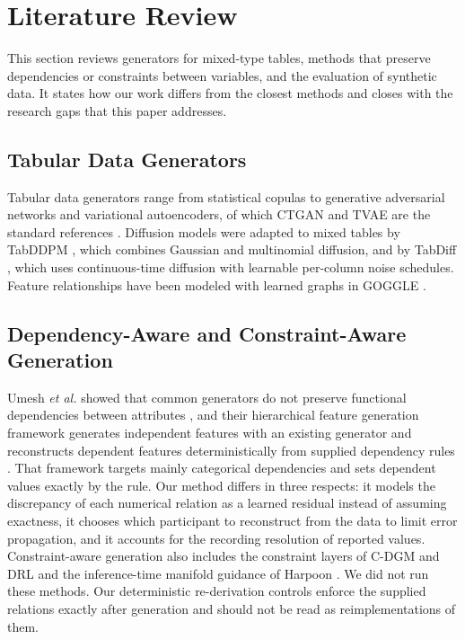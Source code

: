 \documentclass[conference]{IEEEtran}
\begin{document}
\section{Literature Review}
\label{sec:literature}

This section reviews generators for mixed-type tables, methods that preserve dependencies or constraints between variables, and the evaluation of synthetic data. It states how our work differs from the closest methods and closes with the research gaps that this paper addresses.

\subsection{Tabular Data Generators}

Tabular data generators range from statistical copulas to generative adversarial networks and variational autoencoders, of which CTGAN and TVAE are the standard references \cite{xu2019ctgan}. Diffusion models \cite{ho2020ddpm,austin2021d3pm} were adapted to mixed tables by TabDDPM \cite{kotelnikov2023tabddpm}, which combines Gaussian and multinomial diffusion, and by TabDiff \cite{shi2025tabdiff}, which uses continuous-time diffusion with learnable per-column noise schedules. Feature relationships have been modeled with learned graphs in GOGGLE \cite{liu2023goggle}.

\subsection{Dependency-Aware and Constraint-Aware Generation}

Umesh \textit{et al.} showed that common generators do not preserve functional dependencies between attributes \cite{umesh2024dependencies}, and their hierarchical feature generation framework generates independent features with an existing generator and reconstructs dependent features deterministically from supplied dependency rules \cite{umesh2025hfgf}. That framework targets mainly categorical dependencies and sets dependent values exactly by the rule. Our method differs in three respects: it models the discrepancy of each numerical relation as a learned residual instead of assuming exactness, it chooses which participant to reconstruct from the data to limit error propagation, and it accounts for the recording resolution of reported values. Constraint-aware generation also includes the constraint layers of C-DGM \cite{stoian2024cdgm} and DRL \cite{stoian2025drl} and the inference-time manifold guidance of Harpoon \cite{shankar2026harpoon}. We did not run these methods. Our deterministic re-derivation controls enforce the supplied relations exactly after generation and should not be read as reimplementations of them.
\end{document}
